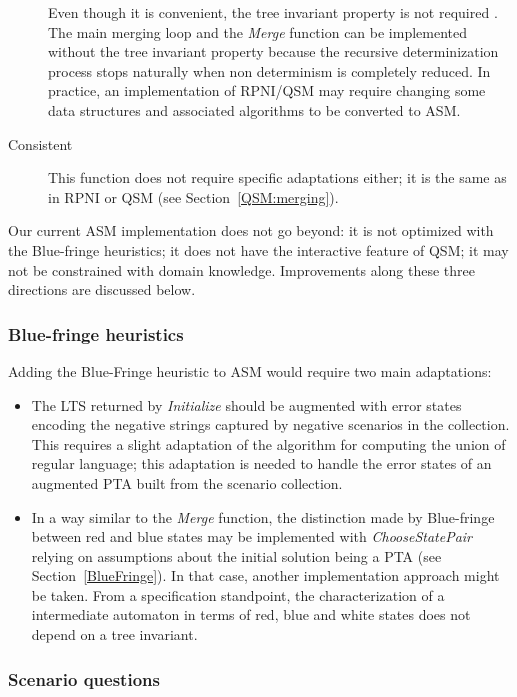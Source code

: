 \begin{description}
Even though it is convenient, the tree invariant property is not required \cite{Lambeau:2008}. The main merging loop and the \emph{Merge} function can be implemented without the tree invariant property because the recursive determinization process stops naturally when non determinism is completely reduced. In practice, an implementation of RPNI/QSM may require changing some data structures and associated algorithms to be converted to ASM.

\item[Consistent] This function does not require specific adaptations either; it is the same as in RPNI or QSM (see Section~\ref{QSM:merging}).

\end{description}

Our current ASM implementation does not go beyond: it is not optimized with the Blue-fringe heuristics; it does not have the interactive feature of QSM; it may not be constrained with domain knowledge. Improvements along these three directions are discussed below.

\subsubsection*{Blue-fringe heuristics}

Adding the Blue-Fringe heuristic to ASM would require two main adaptations: 
\begin{itemize}
\item The LTS returned by \emph{Initialize} should be augmented with error states encoding the negative strings captured by negative scenarios in the collection. This requires a slight adaptation of the algorithm for computing the union of regular language; this adaptation is needed to handle the error states of an augmented PTA built from the scenario collection.
\item In a way similar to the \emph{Merge} function, the distinction made by Blue-fringe between red and blue states may be implemented with \emph{ChooseStatePair} relying on assumptions about the initial solution being a PTA (see Section~\ref{BlueFringe}). In that case, another implementation approach might be taken. From a specification standpoint, the characterization of a intermediate automaton in terms of red, blue and white states does not depend on a tree invariant.
\end{itemize}

\subsubsection*{Scenario questions}

